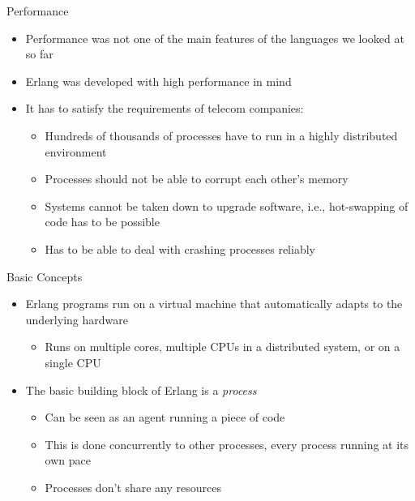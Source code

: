 \documentclass[12pt,xcolor=svgnames]{beamer}
\begin{document}
\begin{frame}{Performance}
\begin{itemize}
\item Performance was not one of the main features of the languages we looked at so far
\item Erlang was developed with high performance in mind
\item It has to satisfy the requirements of telecom companies:
\begin{itemize}
\item Hundreds of thousands of processes have to run in a highly distributed environment
\item Processes should not be able to corrupt each other's memory
\item Systems cannot be taken down to upgrade software, i.e., hot-swapping of code has to be possible
\item Has to be able to deal with crashing processes reliably
\end{itemize}
\end{itemize}
\end{frame}

\begin{frame}{Basic Concepts}
\begin{itemize}
\item Erlang programs run on a virtual machine that automatically adapts to the underlying hardware
\begin{itemize}
\item Runs on multiple cores, multiple CPUs in a distributed system, or on a single CPU 
\end{itemize}
\item The basic building block of Erlang is a \emph{process}
\begin{itemize}
\item Can be seen as an agent running a piece of code
\item This is done concurrently to other processes, every process running at its own pace
\item Processes don't share any resources
\end{itemize}
\end{itemize}
\end{frame}
\end{document}
